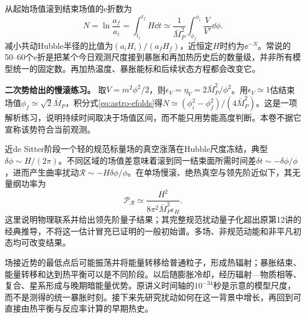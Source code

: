 从起始场值滚到结束场值的e折数为
\begin{equation}\label{eq:astro-efolds}
 N=\ln\frac{a_f}{a_i}=\int_{t_i}^{t_f}H\dd t
 \simeq\frac1{\bar M_P^2}\int_{\phi_f}^{\phi_i}\frac V{V'}\dd\phi.
\end{equation}
减小共动Hubble半径的比值为$(a_iH_i)/(a_fH_f)$，近恒定$H$时约为$\ee^{-N}$。常说的50--60个e折是把某个今日观测尺度接到暴胀和再加热历史后的数量级，并非所有模型统一的固定数。再加热温度、暴胀能标和后续状态方程都会改变它。

\begin{example}
\textbf{二次势给出的慢滚练习。}
取$V=m^2\phi^2/2$，则$\epsilon_V=\eta_V=2\bar M_P^2/\phi^2$。用$\epsilon_V\simeq1$估结束场值$\phi_f\simeq\sqrt2\bar M_P$，积分式\eqref{eq:astro-efolds}得$N\simeq(\phi_i^2-\phi_f^2)/(4\bar M_P^2)$。这是一项解析练习，说明持续时间取决于场值区间，而不能只用势能高度判断。本卷不据它宣称该势符合当前观测。
\end{example}

近de Sitter阶段一个轻的规范标量场的真空涨落在Hubble尺度冻结，典型$\delta\phi\sim H/(2\pi)$。不同区域的场值差意味着滚到同一结束面所需时间差$\delta t\sim-\delta\phi/\dot\phi$，进而产生曲率扰动$\mathcal R\sim-H\delta\phi/\dot\phi$。在单场慢滚、绝热真空与领先阶近似下，其无量纲功率为
\[
 \mathcal P_{\mathcal R}\simeq\frac{H^2}{8\pi^2\bar M_P^2\epsilon_H}.
\]
这里说明物理联系并给出领先阶量子结果；其完整规范扰动量子化超出原第12讲的经典推导，不将这一估计冒充已证明的一般初始谱。多场、非规范动能和非平凡初态均可改变结果。

场接近势的最低点后可能振荡并将能量转移给普通粒子，形成热辐射；暴胀结束、能量转移和达到热平衡可以是不同阶段。以后随膨胀冷却，经历辐射—物质相等、复合、星系形成与晚期暗能量优势。原讲义时间轴的$10^{-34}$秒是示意的模型尺度，而不是测得的统一暴胀时刻。接下来先研究扰动如何在这一背景中增长，再回到可直接由热平衡与反应率计算的早期热史。
